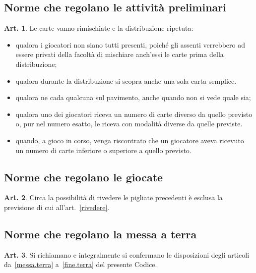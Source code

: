 \documentclass[italian,a4paper]{book}
\theoremstyle{definition}
\newtheorem{art}{Art.}
\newenvironment{packeditem}{
\begin{itemize}
  \setlength{\itemsep}{1pt}
  \setlength{\parskip}{0pt}
  \setlength{\parsep}{0pt}
}{\end{itemize}}
\begin{document}
\subsection{Norme che regolano le attività preliminari}
\begin{art}
Le carte vanno rimischiate e la distribuzione ripetuta:
\begin{packeditem}
\item    qualora i giocatori non siano tutti presenti, poiché gli assenti verrebbero ad essere privati della facoltà di mischiare anch'essi le carte prima della distribuzione;
\item    qualora durante la distribuzione si scopra anche una sola carta semplice.
\item    qualora ne cada qualcuna sul pavimento, anche quando non si vede quale sia;
\item    qualora uno dei giocatori riceva un numero di carte diverso da quello previsto o, pur nel numero esatto, le riceva con modalità diverse da quelle previste.
\item      quando, a gioco in corso, venga riscontrato che un giocatore aveva ricevuto un numero di carte inferiore o superiore a quello previsto.
    \end{packeditem}
\end{art}
\subsection{Norme che regolano le giocate}
\begin{art}
Circa la possibilità di rivedere le pigliate precedenti è esclusa la
previsione di cui all'art.~\ref{rivedere}.
\end{art}
\subsection{Norme che regolano la messa a terra}
\begin{art}
Si richiamano e integralmente si confermano le disposizioni degli articoli
da~\ref{messa.terra} a~\ref{fine.terra} del presente Codice.
\end{art}
\end{document}
